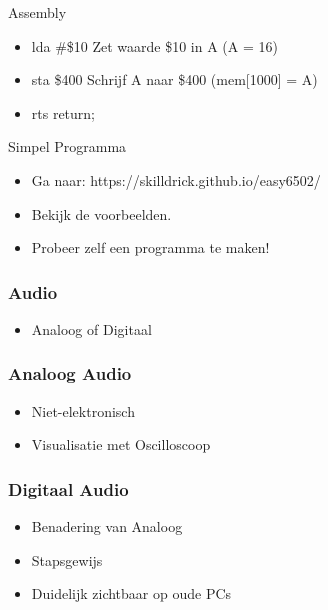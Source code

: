 \documentclass[aspectratio=43]{uva-inf-presentation}
\begin{document}

\begin{frame}{Assembly}

\begin{itemize}
\item lda \#\$10 Zet waarde \$10 in A (A = 16)
\item sta \$400 Schrijf A naar \$400 (mem[1000] = A)
\item rts return;
\end{itemize}

\end{frame}


\begin{frame}{Simpel Programma}

\begin{itemize}
\item Ga naar: https://skilldrick.github.io/easy6502/
\item Bekijk de voorbeelden.
\item Probeer zelf een programma te maken!
\end{itemize}


\end{frame}


\begin{frame}
\frametitle{Audio}

\begin{itemize}
\item Analoog of Digitaal
\end{itemize}

\end{frame}


\begin{frame}
\frametitle{Analoog Audio}

\begin{itemize}
\item Niet-elektronisch
\item Visualisatie met Oscilloscoop
\end{itemize}

\end{frame}


\begin{frame}
\frametitle{Digitaal Audio}

\begin{itemize}
\item Benadering van Analoog
\item Stapsgewijs
\item Duidelijk zichtbaar op oude PCs
\end{itemize}

\end{frame}
\end{document}
